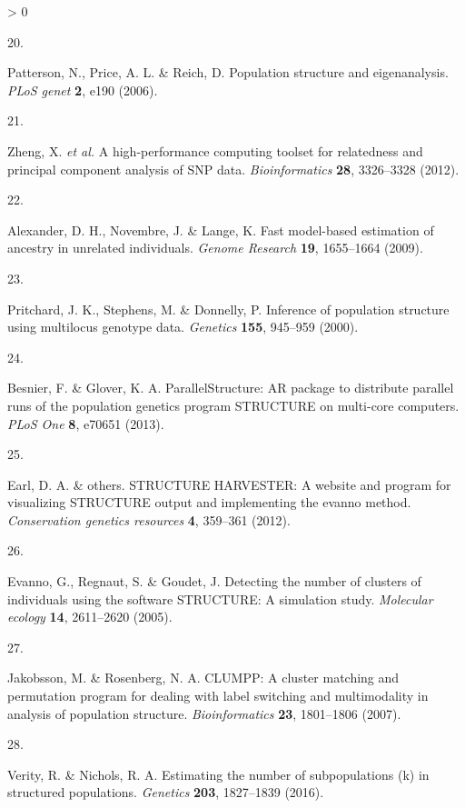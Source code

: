\documentclass[
  11pt,
]{article}
\newlength{\cslhangindent}
\newlength{\csllabelwidth}
\newenvironment{CSLReferences}[2] %
 {%
  \setlength{\parindent}{0pt}
  \ifodd #1 \everypar{\setlength{\hangindent}{\cslhangindent}}\ignorespaces\fi
  \ifnum #2 > 0
  \setlength{\parskip}{#2\baselineskip}
  \fi
 }%
 {}
\newcommand{\CSLLeftMargin}[1]{\parbox[t]{\csllabelwidth}{#1}}
\newcommand{\CSLRightInline}[1]{\parbox[t]{\linewidth - \csllabelwidth}{#1}\break}
\begin{document}
\begin{CSLReferences}{0}{0}
\leavevmode\hypertarget{ref-patterson2006population}{}%
\CSLLeftMargin{20. }
\CSLRightInline{Patterson, N., Price, A. L. \& Reich, D. Population structure and eigenanalysis. \emph{PLoS genet} \textbf{2}, e190 (2006).}

\leavevmode\hypertarget{ref-zheng2012high}{}%
\CSLLeftMargin{21. }
\CSLRightInline{Zheng, X. \emph{et al.} A high-performance computing toolset for relatedness and principal component analysis of SNP data. \emph{Bioinformatics} \textbf{28}, 3326--3328 (2012).}

\leavevmode\hypertarget{ref-alexander2009admixture}{}%
\CSLLeftMargin{22. }
\CSLRightInline{Alexander, D. H., Novembre, J. \& Lange, K. {Fast model-based estimation of ancestry in unrelated individuals}. \emph{Genome Research} \textbf{19}, 1655--1664 (2009).}

\leavevmode\hypertarget{ref-pritchard2000inference}{}%
\CSLLeftMargin{23. }
\CSLRightInline{Pritchard, J. K., Stephens, M. \& Donnelly, P. Inference of population structure using multilocus genotype data. \emph{Genetics} \textbf{155}, 945--959 (2000).}

\leavevmode\hypertarget{ref-besnier2013parallelstructure}{}%
\CSLLeftMargin{24. }
\CSLRightInline{Besnier, F. \& Glover, K. A. ParallelStructure: AR package to distribute parallel runs of the population genetics program STRUCTURE on multi-core computers. \emph{PLoS One} \textbf{8}, e70651 (2013).}

\leavevmode\hypertarget{ref-earl2012structure}{}%
\CSLLeftMargin{25. }
\CSLRightInline{Earl, D. A. \& others. STRUCTURE HARVESTER: A website and program for visualizing STRUCTURE output and implementing the evanno method. \emph{Conservation genetics resources} \textbf{4}, 359--361 (2012).}

\leavevmode\hypertarget{ref-evanno2005detecting}{}%
\CSLLeftMargin{26. }
\CSLRightInline{Evanno, G., Regnaut, S. \& Goudet, J. Detecting the number of clusters of individuals using the software STRUCTURE: A simulation study. \emph{Molecular ecology} \textbf{14}, 2611--2620 (2005).}

\leavevmode\hypertarget{ref-jakobsson2007clumpp}{}%
\CSLLeftMargin{27. }
\CSLRightInline{Jakobsson, M. \& Rosenberg, N. A. CLUMPP: A cluster matching and permutation program for dealing with label switching and multimodality in analysis of population structure. \emph{Bioinformatics} \textbf{23}, 1801--1806 (2007).}

\leavevmode\hypertarget{ref-verity2016estimating}{}%
\CSLLeftMargin{28. }
\CSLRightInline{Verity, R. \& Nichols, R. A. Estimating the number of subpopulations (k) in structured populations. \emph{Genetics} \textbf{203}, 1827--1839 (2016).}


\end{CSLReferences}
\end{document}

